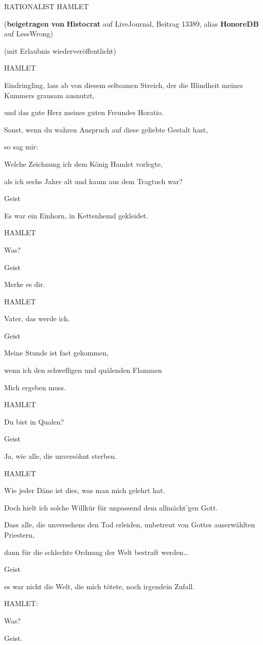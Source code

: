{RATIONALIST HAMLET

(\textbf{beigetragen von} \textbf{Histocrat} auf LiveJournal, Beitrag 13389, alias \textbf{HonoreDB} auf LessWrong)

(mit Erlaubnis wiederveröffentlicht)

HAMLET

Eindringling, lass ab von diesem seltsamen Streich, der die Blindheit meines Kummers grausam ausnutzt,

und das gute Herz meines guten Freundes Horatio.

Sonst, wenn du wahren Anspruch auf diese geliebte Gestalt hast,

so sag mir:

Welche Zeichnung ich dem König Hamlet vorlegte,

als ich sechs Jahre alt und kaum aus dem Tragtuch war?

Geist

Es war ein Einhorn, in Kettenhemd gekleidet.

HAMLET

Was?

Geist

Merke es dir.

HAMLET

Vater, das werde ich.

Geist

Meine Stunde ist fast gekommen,

wenn ich den schwefligen und quälenden Flammen

Mich ergeben muss.

HAMLET

Du bist in Qualen?

Geist

Ja, wie alle, die unversöhnt sterben.

HAMLET

Wie jeder Däne ist dies, was man mich gelehrt hat.

Doch hielt ich solche Willkür für unpassend dem allmächt'gen Gott.

Dass alle, die unversehens den Tod erleiden, unbetreut von Gottes auserwählten Priestern,

dann für die schlechte Ordnung der Welt bestraft werden…

Geist

es war nicht die Welt, die mich tötete, noch irgendein Zufall.

HAMLET:

Was?

Geist.

}
